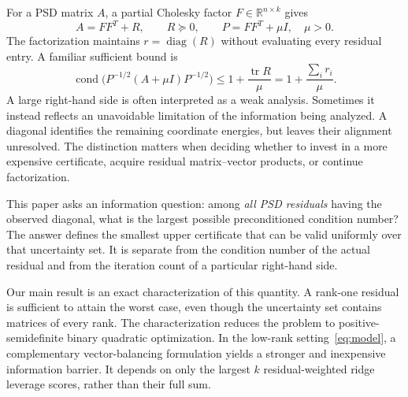 \documentclass[final,leqno,letterpaper]{etna}
\newcommand{\R}{\mathbb R}
\renewcommand{\diag}{\operatorname{diag}}
\newcommand{\tr}{\operatorname{tr}}
\newcommand{\cond}{\operatorname{cond}}
\begin{document}
For a PSD matrix $A$, a partial Cholesky factor $F\in\R^{n\times k}$ gives
\begin{equation}\label{eq:model}
 A=FF^T+R,\qquad R\succeq0,\qquad P=FF^T+\mu I,\quad \mu>0.
\end{equation}
The factorization maintains $r=\diag(R)$ without evaluating every residual entry. A familiar sufficient bound is
\begin{equation}\label{eq:trace}
 \cond\bigl(P^{-1/2}(A+\mu I)P^{-1/2}\bigr)
 \le 1+\frac{\tr R}{\mu}=1+\frac{\sum_i r_i}{\mu}.
\end{equation}
A large right-hand side is often interpreted as a weak analysis. Sometimes it instead reflects an unavoidable limitation of the information being analyzed. A diagonal identifies the remaining coordinate energies, but leaves their alignment unresolved. The distinction matters when deciding whether to invest in a more expensive certificate, acquire residual matrix--vector products, or continue factorization.

This paper asks an information question: among \emph{all PSD residuals} having the observed diagonal, what is the largest possible preconditioned condition number? The answer defines the smallest upper certificate that can be valid uniformly over that uncertainty set. It is separate from the condition number of the actual residual and from the iteration count of a particular right-hand side.

Our main result is an exact characterization of this quantity. A rank-one residual is sufficient to attain the worst case, even though the uncertainty set contains matrices of every rank. The characterization reduces the problem to positive-semidefinite binary quadratic optimization. In the low-rank setting~\eqref{eq:model}, a complementary vector-balancing formulation yields a stronger and inexpensive information barrier. It depends on only the largest $k$ residual-weighted ridge leverage scores, rather than their full sum.
\end{document}
